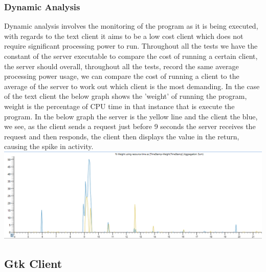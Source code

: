 \documentclass{article}
\begin{document}
\subsubsection{Dynamic Analysis}
Dynamic analysis involves the monitoring of the program as it is being executed, with regards to the text client it aims to be a low cost client which does not require significant processing power to run. Throughout all the tests we have the constant of the server executable to compare the cost of running a certain client, the server should overall, throughout all the tests, record the same average processing power usage, we can compare the cost of running a client to the average of the server to work out which client is the most demanding. In the case of the text client the below graph shows the 'weight' of running the program, weight is the percentage of CPU time in that instance that is execute the program. In the below graph the server is the yellow line and the client the blue, we see, as the client sends a request just before 9 seconds the server receives the request and then responds, the client then displays the value in the return, causing the spike in activity.  \\
\includegraphics[width=\textwidth]{textgraph.PNG}
\subsection{Gtk Client}
\end{document}
